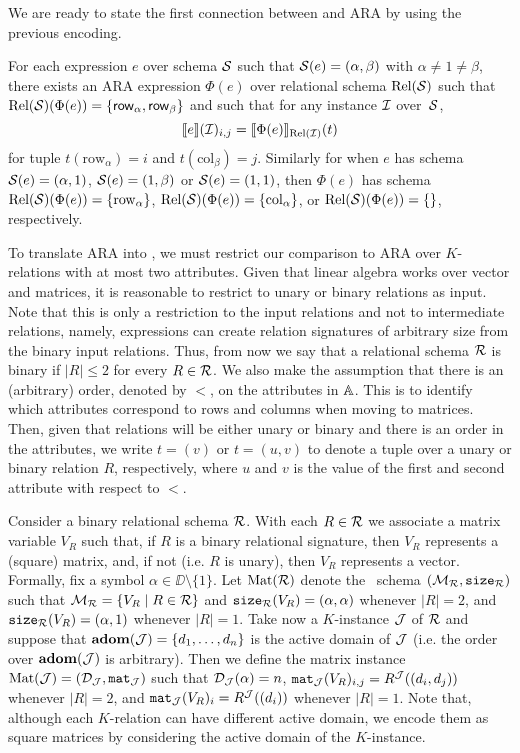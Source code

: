 We are ready to state the first connection between \langsum and ARA by using the previous encoding.
\begin{proposition}
	For each \langsum expression $e$ over schema $\mathcal{S}$ such that $\mathcal{S}(e)=(\alpha,\beta)$ with $\alpha\neq 1\neq\beta$, there exists an ARA expression $\Phi(e)$ over relational schema $\text{Rel}(\mathcal{S})$ such that $\text{Rel}(\mathcal{S})(\Phi(e))=\{\mathsf{row}_\alpha,\mathsf{row}_\beta\}$ and 
	such that for any instance $\mathcal{I}$ over~$\mathcal{S}$,
	$$
	\llbracket e \rrbracket(\mathcal{I})_{i,j}=\llbracket \Phi(e) \rrbracket_{\text{Rel}(\mathcal{I})}(t)
	$$
	for tuple $t(\mathrm{row}_\alpha)=i$ and $t(\mathrm{col}_\beta)=j$. Similarly for when $e$ has schema $\mathcal{S}(e)=(\alpha,1)$, $\mathcal{S}(e)=(1,\beta)$ or $\mathcal{S}(e)=(1,1)$, then $\Phi(e)$ has schema $\text{Rel}(\mathcal{S})(\Phi(e))=\{\mathrm{row}_\alpha\}$,
	$\text{Rel}(\mathcal{S})(\Phi(e))=\{\mathrm{col}_\alpha\}$, or
	$\text{Rel}(\mathcal{S})(\Phi(e))=\{\}$, respectively.
\end{proposition}
To translate ARA into \langsum, we must restrict our comparison to ARA over $K$-relations with at most two attributes. Given that linear algebra works over vector and matrices, it is reasonable to restrict to unary or binary relations as input. Note that this is only a restriction to the input relations and not to intermediate relations, namely, expressions can create relation signatures of arbitrary size from the binary input relations. Thus, from now we say that a relational schema $\mathcal{R}$ is binary if $|R| \leq 2$ for every $R \in \mathcal{R}$. We also make the assumption that there is an (arbitrary) order, denoted by $<$, on the attributes in $\mathbb{A}$. 
This is to identify which attributes correspond to rows and columns when moving to matrices. 
Then, given that relations will be  either unary or binary and there is an order in the attributes, we write $t = (v)$ or $t = (u,v)$ to denote a tuple over a unary or binary relation $R$, respectively, where $u$ and $v$ is the value of the first and second attribute with respect to $<$.

Consider a binary relational schema $\mathcal{R}$. With each $R\in \mathcal{R}$ we associate a matrix variable $V_R$ such that, if $R$ is a binary relational signature, then $V_R$ represents a (square) matrix, and, if not (i.e. $R$ is unary), then $V_R$ represents a vector. Formally, fix a symbol $\alpha \in \DD \setminus \{1\}$. Let $\text{Mat}(\mathcal{R})$ denote the \lang \ schema
$(\mathcal{M}_{\mathcal{R}},\texttt{size}_{\mathcal{R}})$ such that $\mathcal{M}_{\mathcal{R}} = \{ V_R \mid R \in \mathcal{R}\}$ and $\texttt{size}_{\mathcal{R}}(V_R) = (\alpha, \alpha)$ whenever $|R| = 2$, and $\texttt{size}_{\mathcal{R}}(V_R) = (\alpha, 1)$ whenever $|R|=1$. 
Take now a $K$-instance $\mathcal{J}$ of $\mathcal{R}$ and suppose that $\mathbf{adom}(\mathcal{J}) = \{d_1, \ldots, d_n\}$ is the active domain of $\mathcal{J}$ (i.e. the order over $\mathbf{adom}(\mathcal{J})$ is arbitrary). Then we define the matrix instance $\text{Mat}(\mathcal{J}) = (\mathcal{D}_{\mathcal{J}},\texttt{mat}_{\mathcal{J}})$ such that $\mathcal{D}_{\mathcal{J}}(\alpha) = n$, $\texttt{mat}_{\mathcal{J}}(V_R)_{i,j} = R^{\mathcal{J}}((d_i, d_j))$ whenever $|R|=2$, and $\texttt{mat}_{\mathcal{J}}(V_R)_{i} = R^{\mathcal{J}}((d_i))$ whenever $|R|=1$. 
Note that, although each $K$-relation can have different active domain, we encode them as square matrices by considering the active domain of the $K$-instance.

